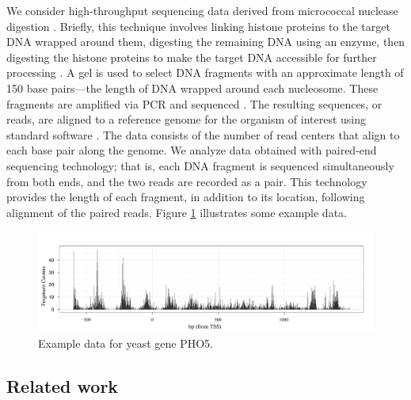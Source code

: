 We consider high-throughput sequencing data derived from micrococcal nuclease digestion %
\citep{Tirosh2012}.
%
Briefly, this technique involves
 linking histone proteins to the target DNA wrapped around them, 
 digesting the remaining DNA using an enzyme,
 then digesting the histone proteins to make the target DNA accessible for further processing \citep[e.g., see][]{Tsankov2010}.
A gel is used to select DNA fragments with an approximate length of 150 base pairs---the length of DNA wrapped around each nucleosome.
These fragments are amplified via PCR and sequenced \citep{Albert2007}.
The resulting sequences, or reads, are aligned to a reference genome for the organism of interest using standard software \citep[Bowtie;][]{lang:trap:pop:salz:2009}.
The data consists of the number of read centers that align to each base pair along the genome.
%
We analyze data obtained with paired-end sequencing technology; that is, each DNA fragment is sequenced simultaneously from both ends, and the two reads are recorded as a pair.
This technology provides the length of each fragment, in addition to its location, following alignment of the paired reads.
Figure \ref{nucleosomes:fig:example_data} illustrates some example data.

\ifx\nofigures\undefined
\begin{figure}[b!]
\centering
 \includegraphics[width=\textwidth]{figures/nucleosomes/readsPlot_H_1-PHO5}
 \caption{Example data for yeast gene PHO5.\label{nucleosomes:fig:example_data}} 
\end{figure}
\fi

\subsection{Related work}

